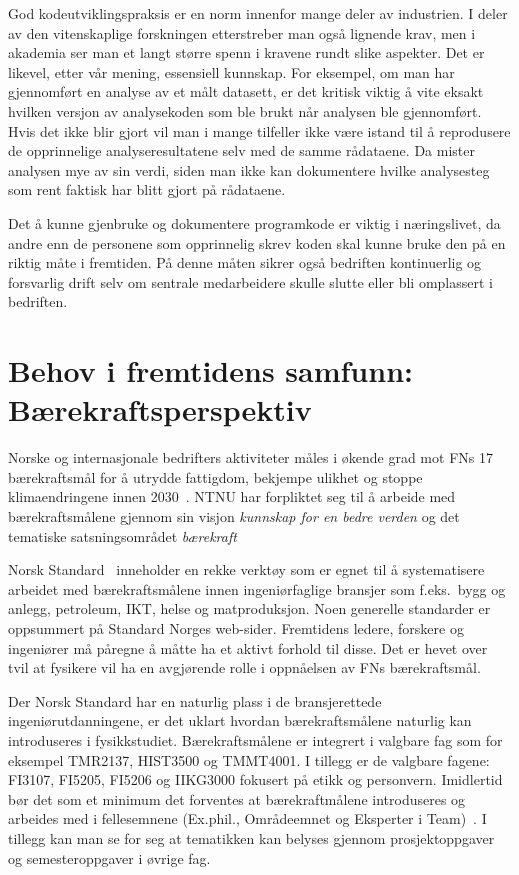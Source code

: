 \documentclass{article}
\begin{document}
God kodeutviklingspraksis er en norm innenfor mange deler av industrien. I deler av den vitenskaplige forskningen etterstreber man også lignende krav, men i akademia ser man et langt større spenn i kravene rundt slike aspekter. Det er likevel, etter vår mening, essensiell kunnskap. For eksempel, om man har gjennomført en analyse av et målt datasett, er det kritisk viktig å vite eksakt hvilken versjon av analysekoden som ble brukt når analysen ble gjennomført. Hvis det ikke blir gjort vil man i mange tilfeller ikke være istand til å reprodusere de opprinnelige analyseresultatene selv med de samme rådataene. Da mister analysen mye av sin verdi, siden man ikke kan dokumentere hvilke analysesteg som rent faktisk har blitt gjort på rådataene.

Det å kunne gjenbruke og dokumentere programkode er viktig i næringslivet, da andre enn de personene som opprinnelig skrev koden skal kunne bruke den på en riktig måte i fremtiden. På denne måten sikrer også bedriften kontinuerlig og forsvarlig drift selv om sentrale medarbeidere skulle slutte eller bli omplassert i bedriften.

\section{Behov i fremtidens samfunn: Bærekraftsperspektiv}
\label{sec:behov-bkraft}
Norske og internasjonale bedrifters aktiviteter måles i økende grad mot FNs 17 bærekraftsmål for å utrydde fattigdom, bekjempe ulikhet og stoppe klimaendringene innen 2030~\cite{FNsustgoals}.
NTNU har forpliktet seg til å arbeide med bærekraftsmålene gjennom sin visjon \emph{kunnskap for en bedre verden} og det tematiske satsningsområdet \emph{bærekraft}~\cite{NTNUStrategi,NTNUBaerekraftMaal,NTNUBaerekraft}

Norsk Standard~\cite{StandardNorge} inneholder en rekke verktøy som er egnet til å systematisere arbeidet med bærekraftsmålene innen ingeniørfaglige bransjer som f.eks.~bygg og anlegg, petroleum, IKT, helse og matproduksjon.
Noen generelle standarder er oppsummert på Standard Norges web-sider.
Fremtidens ledere, forskere og ingeniører må påregne å måtte ha et aktivt forhold til disse.
Det er hevet over tvil at fysikere vil ha en avgjørende rolle i oppnåelsen av FNs bærekraftsmål.

Der Norsk Standard har en naturlig plass i de bransjerettede ingeniørutdanningene, er det uklart hvordan bærekraftsmålene naturlig kan introduseres i fysikkstudiet. Bærekraftsmålene er integrert i valgbare fag som for eksempel TMR2137, HIST3500 og TMMT4001. I tillegg er de valgbare fagene: FI3107, FI5205, FI5206 og IIKG3000 fokusert på etikk og personvern. Imidlertid bør det som et minimum det forventes at bærekraftmålene introduseres og arbeides med i fellesemnene (Ex.phil., Områdeemnet og Eksperter i Team)~\cite{NTNUFellesEmner}.
I tillegg kan man se for seg at tematikken kan belyses gjennom prosjektoppgaver og semesteroppgaver i øvrige fag.
\end{document}

